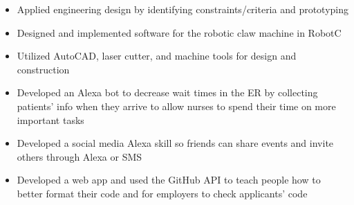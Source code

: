 \documentclass[8pt,a4paper]{altacv}
\begin{document}

\begin{itemize}
\item Applied engineering design by identifying constraints/criteria and prototyping
\item Designed and implemented software for the robotic claw machine in RobotC
\item Utilized AutoCAD, laser cutter, and machine tools for design and construction
\end{itemize}
\bigskip

\begin{itemize}
\item Developed an Alexa bot to decrease wait times in the ER by collecting patients' info when they arrive to allow nurses to spend their time on more important tasks
\end{itemize}
\divider

\begin{itemize}
\item Developed a social media Alexa skill so friends can share events and invite others through Alexa or SMS
\end{itemize}
\divider

\begin{itemize}
\item Developed a web app and used the GitHub API to teach people how to better format their code and for employers to check applicants' code
\end{itemize}
\divider
\end{document}
